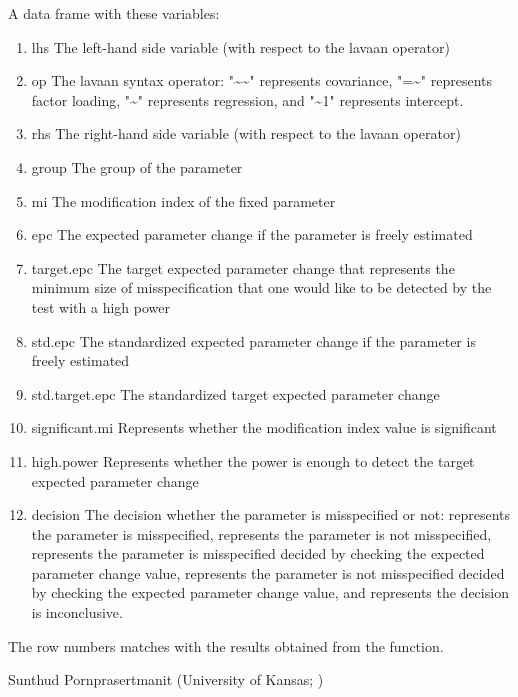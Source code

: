 \documentclass[a4paper]{book}
\begin{document}
%
\begin{Value}
A data frame with these variables:
\begin{enumerate}

\item lhs The left-hand side variable (with respect to the lavaan operator)
\item op The lavaan syntax operator: "\textasciitilde{}\textasciitilde{}" represents covariance, "=\textasciitilde{}" represents factor loading, "\textasciitilde{}" represents regression, and "\textasciitilde{}1" represents intercept. 
\item rhs The right-hand side variable (with respect to the lavaan operator)
\item group The group of the parameter
\item mi The modification index of the fixed parameter
\item epc The expected parameter change if the parameter is freely estimated
\item target.epc The target expected parameter change that represents the minimum size of misspecification that one would like to be detected by the test with a high power
\item std.epc The standardized expected parameter change if the parameter is freely estimated
\item std.target.epc The standardized target expected parameter change
\item significant.mi Represents whether the modification index value is significant
\item high.power Represents whether the power is enough to detect the target expected parameter change
\item decision The decision whether the parameter is misspecified or not:  represents the parameter is misspecified,  represents the parameter is not misspecified,  represents the parameter is misspecified decided by checking the expected parameter change value,  represents the parameter is not misspecified decided by checking the expected parameter change value, and  represents the decision is inconclusive.

\end{enumerate}

The row numbers matches with the results obtained from the  function.
\end{Value}
%
\begin{Author}\relax
Sunthud Pornprasertmanit (University of Kansas; )
\end{Author}
\end{document}
